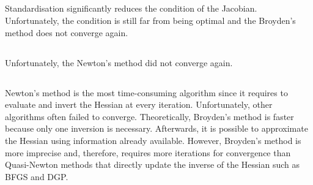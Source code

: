 \documentclass{article}
\begin{document}
\subsection{}
%
Standardisation significantly reduces the condition of the Jacobian. Unfortunately, the condition is still far from being optimal and the Broyden's method does not converge again.

\subsection{}
%
Unfortunately, the Newton's method did not converge again.

\subsection{}
Newton's method is the most time-consuming algorithm since it requires to evaluate and invert the Hessian at every iteration. Unfortunately, other algorithms often failed to converge. Theoretically, Broyden's method is faster because only one inversion is necessary. Afterwards, it is possible to approximate the Hessian using information already available. However, Broyden's method is more imprecise and, therefore, requires more iterations for convergence than Quasi-Newton methods that directly update the inverse of the Hessian such as BFGS and DGP.

 
\end{document}
